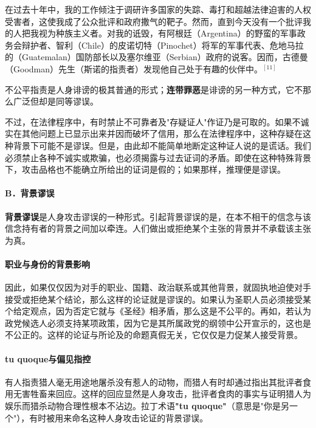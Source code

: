 \begin{displayquote}
在过去十年中，我的工作倾注于调研许多国家的失踪、毒打和超越法律迫害的人权受害者，这使我成了公众批评和政府撒气的靶子。然而，直到今天没有一个批评我的人把我视为种族主义者。对我的诋毁，有阿根廷（Argentina）的野蛮的军事政务会辩护者、智利（Chile）的皮诺切特（Pinochet）将军的军事代表、危地马拉的（Guatemalan）国防部长以及塞尔维亚（Serbian）政府的说客。因而，古德曼（Goodman）先生（斯诺的指责者）发现他自己处于有趣的伙伴中。${ }^{[11]}$
\end{displayquote}

不公平指责是人身诽谤的极其普通的形式；\textbf{连带罪恶}是诽谤的另一种方式，它不那么广泛但却是同等谬误。

不过，在法律程序中，有时禁止不可靠者及"存疑证人"作证乃是可取的。如果不诚实在其他问题上已显示出来并因而破坏了信用，那么在法律程序中，这种存疑在这种背景下可能不是谬误。但是，由此却不能简单地断定这种证人说的是谎话。我们必须禁止各种不诚实或欺骗，也必须揭露与过去证词的矛盾。即使在这种特殊背景下，攻击品格也不能确立所给出的证词是假的；如果那样，推理便是谬误。

\paragraph{B．背景谬误}

\textbf{背景谬误}是人身攻击谬误的一种形式。引起背景谬误的是，在本不相干的信念与该信念持有者的背景之间加以牵连。人们做出或拒绝某个主张的背景并不承载该主张为真。

\paragraph{职业与身份的背景影响}
因此，如果仅仅因为对手的职业、国籍、政治联系或其他背景，就固执地迫使对手接受或拒绝某个结论，那么这样的论证就是谬误的。如果认为圣职人员必须接受某个给定观点，因为否定它就与《圣经》相矛盾，那么这是不公平的。再如，若认为政党候选人必须支持某项政策，因为它是其所属政党的纲领中公开宣示的，这也是不公正的。这样的论证与所论及的命题真假无关，它仅仅是力促某人接受背景。

\paragraph{tu quoque与偏见指控}
有人指责猎人毫无用途地屠杀没有惹人的动物，而猎人有时却通过指出其批评者食用无害牲畜来回应。这样的回应显然是人身攻击，批评者食肉的事实与证明猎人为娱乐而猎杀动物合理性根本不沾边。拉丁术语\textbf{"tu quoque"}（意思是"你是另一个"），有时被用来命名这种人身攻击论证的背景谬误。

